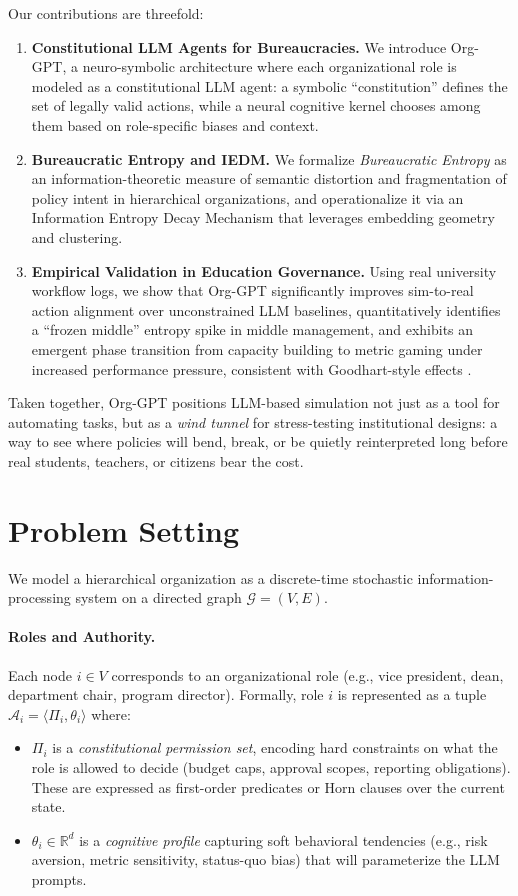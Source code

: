 \documentclass{article}
\begin{document}
Our contributions are threefold:
\begin{enumerate}
    \item \textbf{Constitutional LLM Agents for Bureaucracies.} 
    We introduce Org-GPT, a neuro-symbolic architecture where each organizational role is modeled as a constitutional LLM agent: a symbolic ``constitution'' defines the set of legally valid actions, while a neural cognitive kernel chooses among them based on role-specific biases and context.
    \item \textbf{Bureaucratic Entropy and IEDM.} 
    We formalize \emph{Bureaucratic Entropy} as an information-theoretic measure of semantic distortion and fragmentation of policy intent in hierarchical organizations, and operationalize it via an Information Entropy Decay Mechanism that leverages embedding geometry and clustering.
    \item \textbf{Empirical Validation in Education Governance.} 
    Using real university workflow logs, we show that Org-GPT significantly improves sim-to-real action alignment over unconstrained LLM baselines, quantitatively identifies a ``frozen middle'' entropy spike in middle management, and exhibits an emergent phase transition from capacity building to metric gaming under increased performance pressure, consistent with Goodhart-style effects \citep{goodhart1975problems,wu2019evaluation}.
\end{enumerate}

Taken together, Org-GPT positions LLM-based simulation not just as a tool for automating tasks, but as a \emph{wind tunnel} for stress-testing institutional designs: a way to see where policies will bend, break, or be quietly reinterpreted long before real students, teachers, or citizens bear the cost.
\section{Problem Setting}
\label{sec:problem-setting}
We model a hierarchical organization as a discrete-time stochastic information-processing system on a directed graph $\mathcal{G} = (V, E)$.

\paragraph{Roles and Authority.}
Each node $i \in V$ corresponds to an organizational role (e.g., vice president, dean, department chair, program director).
Formally, role $i$ is represented as a tuple
$\mathcal{A}_i = \langle \Pi_i, \theta_i \rangle$ where:
\begin{itemize}
    \item $\Pi_i$ is a \emph{constitutional permission set}, encoding hard constraints on what the role is allowed to decide (budget caps, approval scopes, reporting obligations). These are expressed as first-order predicates or Horn clauses over the current state.
    \item $\theta_i \in \mathbb{R}^d$ is a \emph{cognitive profile} capturing soft behavioral tendencies (e.g., risk aversion, metric sensitivity, status-quo bias) that will parameterize the LLM prompts.
\end{itemize}
\end{document}
